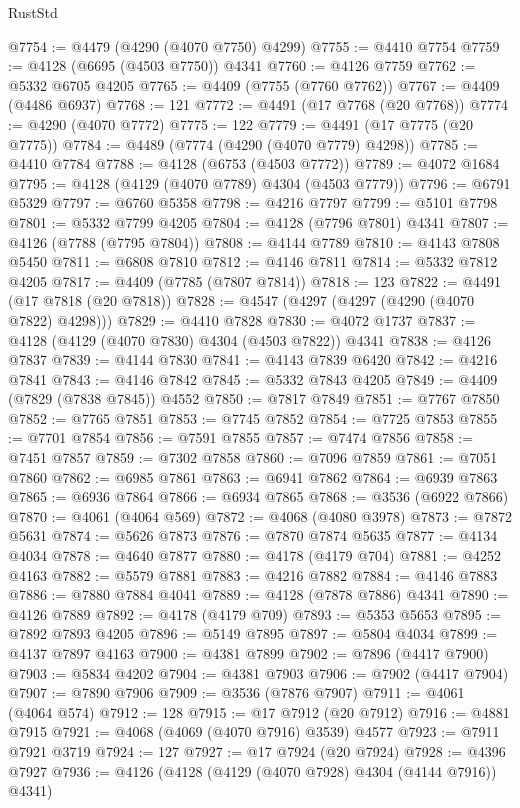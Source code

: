 \begin{lexlean}{RustStd}
\begin{coremodule}
@7754 := @4479 (@4290 (@4070 @7750) @4299)
@7755 := @4410 @7754
@7759 := @4128 (@6695 (@4503 @7750)) @4341
@7760 := @4126 @7759
@7762 := @5332 @6705 @4205
@7765 := @4409 (@7755 (@7760 @7762))
@7767 := @4409 (@4486 @6937)
@7768 := 121
@7772 := @4491 (@17 @7768 (@20 @7768))
@7774 := @4290 (@4070 @7772)
@7775 := 122
@7779 := @4491 (@17 @7775 (@20 @7775))
@7784 := @4489 (@7774 (@4290 (@4070 @7779) @4298))
@7785 := @4410 @7784
@7788 := @4128 (@6753 (@4503 @7772))
@7789 := @4072 @1684
@7795 := @4128 (@4129 (@4070 @7789) @4304 (@4503 @7779))
@7796 := @6791 @5329
@7797 := @6760 @5358
@7798 := @4216 @7797
@7799 := @5101 @7798
@7801 := @5332 @7799 @4205
@7804 := @4128 (@7796 @7801) @4341
@7807 := @4126 (@7788 (@7795 @7804))
@7808 := @4144 @7789
@7810 := @4143 @7808 @5450
@7811 := @6808 @7810
@7812 := @4146 @7811
@7814 := @5332 @7812 @4205
@7817 := @4409 (@7785 (@7807 @7814))
@7818 := 123
@7822 := @4491 (@17 @7818 (@20 @7818))
@7828 := @4547 (@4297 (@4297 (@4290 (@4070 @7822) @4298)))
@7829 := @4410 @7828
@7830 := @4072 @1737
@7837 := @4128 (@4129 (@4070 @7830) @4304 (@4503 @7822)) @4341
@7838 := @4126 @7837
@7839 := @4144 @7830
@7841 := @4143 @7839 @6420
@7842 := @4216 @7841
@7843 := @4146 @7842
@7845 := @5332 @7843 @4205
@7849 := @4409 (@7829 (@7838 @7845)) @4552
@7850 := @7817 @7849
@7851 := @7767 @7850
@7852 := @7765 @7851
@7853 := @7745 @7852
@7854 := @7725 @7853
@7855 := @7701 @7854
@7856 := @7591 @7855
@7857 := @7474 @7856
@7858 := @7451 @7857
@7859 := @7302 @7858
@7860 := @7096 @7859
@7861 := @7051 @7860
@7862 := @6985 @7861
@7863 := @6941 @7862
@7864 := @6939 @7863
@7865 := @6936 @7864
@7866 := @6934 @7865
@7868 := @3536 (@6922 @7866)
@7870 := @4061 (@4064 @569)
@7872 := @4068 (@4080 @3978)
@7873 := @7872 @5631
@7874 := @5626 @7873
@7876 := @7870 @7874 @5635
@7877 := @4134 @4034
@7878 := @4640 @7877
@7880 := @4178 (@4179 @704)
@7881 := @4252 @4163
@7882 := @5579 @7881
@7883 := @4216 @7882
@7884 := @4146 @7883
@7886 := @7880 @7884 @4041
@7889 := @4128 (@7878 @7886) @4341
@7890 := @4126 @7889
@7892 := @4178 (@4179 @709)
@7893 := @5353 @5653
@7895 := @7892 @7893 @4205
@7896 := @5149 @7895
@7897 := @5804 @4034
@7899 := @4137 @7897 @4163
@7900 := @4381 @7899
@7902 := @7896 (@4417 @7900)
@7903 := @5834 @4202
@7904 := @4381 @7903
@7906 := @7902 (@4417 @7904)
@7907 := @7890 @7906
@7909 := @3536 (@7876 @7907)
@7911 := @4061 (@4064 @574)
@7912 := 128
@7915 := @17 @7912 (@20 @7912)
@7916 := @4881 @7915
@7921 := @4068 (@4069 (@4070 @7916) @3539) @4577
@7923 := @7911 @7921 @3719
@7924 := 127
@7927 := @17 @7924 (@20 @7924)
@7928 := @4396 @7927
@7936 := @4126 (@4128 (@4129 (@4070 @7928) @4304 (@4144 @7916)) @4341)

\end{coremodule}
\end{lexlean}
